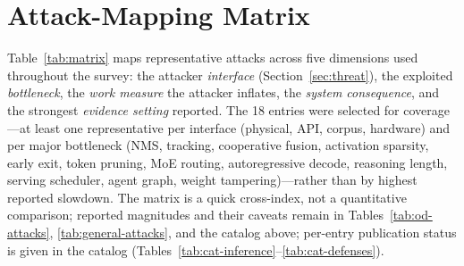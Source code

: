 \documentclass[acmsmall,screen,review,nonacm]{acmart}
\begin{document}


\section{Attack-Mapping Matrix}
\label{sec:matrix}

Table~\ref{tab:matrix} maps representative attacks across five dimensions used throughout the survey: the attacker \emph{interface} (Section~\ref{sec:threat}), the exploited \emph{bottleneck}, the \emph{work measure} the attacker inflates, the \emph{system consequence}, and the strongest \emph{evidence setting} reported. The 18 entries were selected for coverage---at least one representative per interface (physical, API, corpus, hardware) and per major bottleneck (NMS, tracking, cooperative fusion, activation sparsity, early exit, token pruning, MoE routing, autoregressive decode, reasoning length, serving scheduler, agent graph, weight tampering)---rather than by highest reported slowdown. The matrix is a quick cross-index, not a quantitative comparison; reported magnitudes and their caveats remain in Tables~\ref{tab:od-attacks}, \ref{tab:general-attacks}, and the catalog above; per-entry publication status is given in the catalog (Tables~\ref{tab:cat-inference}--\ref{tab:cat-defenses}).
\end{document}
